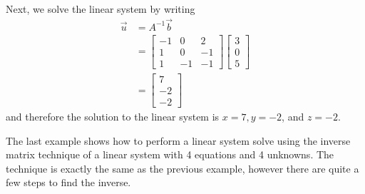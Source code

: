 \begin{example}
Next, we solve the linear system by writing 
%
\begin{align*}
	\vec{u} & = A^{-1}\vec{b} \\
	& = \begin{bmatrix}
-1 & 0 & 2\\
1 & 0 & -1 \\
1 & -1 & -1
\end{bmatrix} 
\begin{bmatrix}
	3\\ 0 \\ 5 
\end{bmatrix} \\
& = 
\begin{bmatrix}
	7 \\ -2 \\ -2 
\end{bmatrix}
\end{align*}
and therefore the solution to the linear system is $x=7, y=-2$, and $z=-2$. 
\end{example}

The last example shows how to perform a linear system solve using the inverse matrix technique of a linear system with 4 equations and 4 unknowns.  The technique is exactly the same as the previous example, however there are quite a few steps to find the inverse. 


